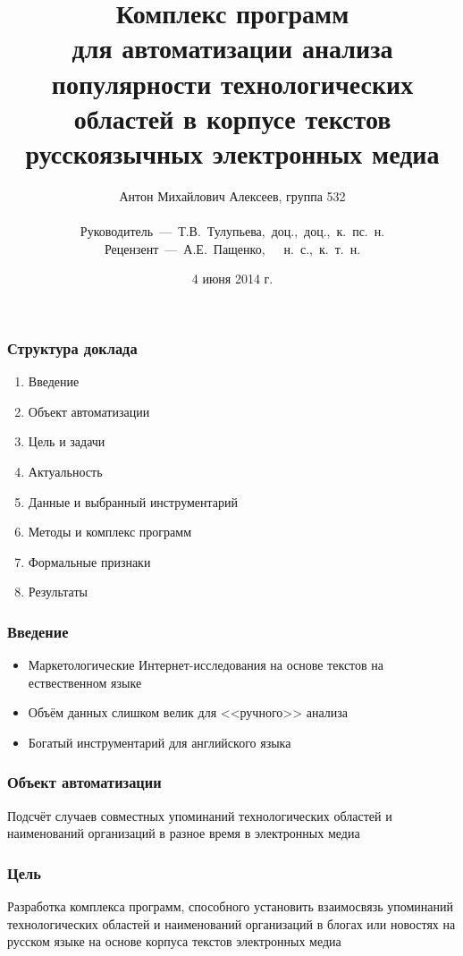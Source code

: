 \documentclass{beamer}
\title{Комплекс программ \\для автоматизации анализа популярности технологических 
областей в корпусе текстов русскоязычных электронных медиа}
\author{{\small Антон Михайлович Алексеев, группа 532\\~\\ Руководитель~---~Т.В.~Тулупьева,~доц.,~доц.,~к.~пс.~н. \\ Рецензент~---~А.Е.~Пащенко,~~~н.~с.,~к.~т.~н.}}
\institute{Санкт-Петербургский государственный университет\\Математико-механический факультет\\ Кафедра информатики}
\date{4 июня 2014 г.}
\begin{document}

{
\frame{\titlepage}
}

\begin{frame}\frametitle{Структура доклада}
    \begin{enumerate}
        \item Введение
        \item Объект автоматизации
        \item Цель и задачи
        \item Актуальность
        \item Данные и выбранный инструментарий
        \item Методы и комплекс программ
        \item Формальные признаки
        \item Результаты
    \end{enumerate}
\end{frame}


\begin{frame}\frametitle{Введение}

\begin{itemize}
\item Маркетологические Интернет-исследования на основе текстов на ествественном языке
\item Объём данных слишком велик для <<ручного>> анализа
\item Богатый инструментарий для английского языка
\end{itemize}
\end{frame}


\begin{frame} \frametitle{Объект автоматизации}
Подсчёт случаев совместных упоминаний технологических областей и наименований организаций в разное время в электронных медиа
\end{frame}


\begin{frame}\frametitle{Цель}
Разработка комплекса программ, способного установить взаимосвязь упоминаний технологических областей и наименований
организаций в блогах или новостях на русском языке на основе корпуса текстов электронных медиа 
\end{frame}
\end{document}
